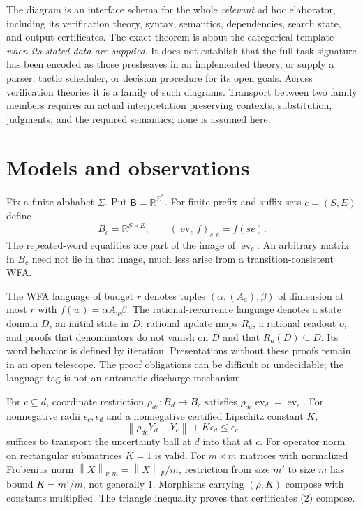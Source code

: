 \documentclass[11pt]{article}
\newcommand{\Cat}[1]{\mathsf{#1}}
\newcommand{\R}{\mathbb R}
\newcommand{\norm}[1]{\left\lVert #1\right\rVert}
\newcommand{\ev}{\operatorname{ev}}
\begin{document}
The diagram is an interface schema for the whole \emph{relevant} ad hoc
elaborator, including its verification theory, syntax, semantics,
dependencies, search state, and output certificates. The exact theorem is
about the categorical template \emph{when its stated data are supplied}.
It does not establish that the full task signature has been encoded as
those presheaves in an implemented theory, or supply a parser, tactic
scheduler, or decision procedure for its open goals. Across verification
theories it is a family of such diagrams. Transport between two family
members requires an actual interpretation preserving contexts,
substitution, judgments, and the required semantics; none is assumed here.

\section{Models and observations}

Fix a finite alphabet $\Sigma$. Put $\Cat B=\R^{\Sigma^*}$.
For finite prefix and suffix sets $c=(S,E)$ define
\[
 B_c=\R^{S\times E},\qquad
 (\ev_c f)_{s,e}=f(se).
\]
The repeated-word equalities are part of the image of $\ev_c$.
An arbitrary matrix in $B_c$ need not lie in that image, much less arise
from a transition-consistent WFA.

The WFA language of budget $r$ denotes tuples
$(\alpha,(A_a),\beta)$ of dimension at most $r$ with
$f(w)=\alpha A_w\beta$. The rational-recurrence language denotes a
state domain $D$, an initial state in $D$, rational update maps $R_a$,
a rational readout $o$, and proofs that denominators do not vanish on
$D$ and that $R_a(D)\subseteq D$. Its word behavior is defined by
iteration. Presentations without these proofs remain in an open telescope.
The proof obligations can be difficult or undecidable; the language tag
is not an automatic discharge mechanism.

For $c\subseteq d$, coordinate restriction
$\rho_{dc}:B_d\to B_c$ satisfies
$\rho_{dc}\ev_d=\ev_c$. For nonnegative radii $\epsilon_c,\epsilon_d$ and a nonnegative
certified Lipschitz constant $K$,
\[
 \norm{\rho_{dc}Y_d-Y_c}+K\epsilon_d\leq\epsilon_c             \tag{2}
\]
suffices to transport the uncertainty ball at $d$ into that at $c$.
For operator norm on rectangular submatrices $K=1$ is valid.
For $m\times m$ matrices with normalized Frobenius norm
$\norm{X}_{\nu,m}=\norm{X}_F/m$, restriction from size $m'$ to size
$m$ has bound $K=m'/m$, not generally $1$.
Morphisms carrying $(\rho,K)$ compose with constants multiplied.
The triangle inequality proves that certificates (2) compose.
\end{document}
